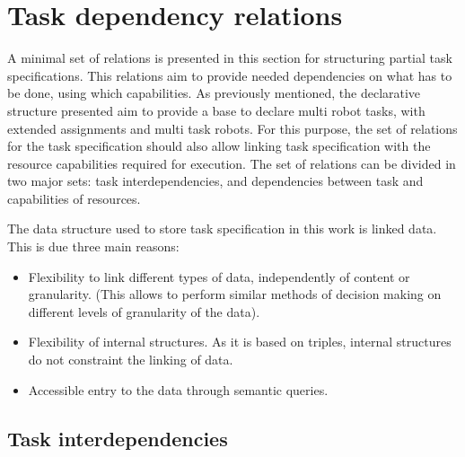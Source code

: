 \documentclass[a4paper,10pt]{article}
\begin{document}
\section{Task dependency relations }


A minimal set of relations is presented in this section for structuring partial task specifications.  This relations aim to provide needed dependencies on what has to be done, using which capabilities.
As previously mentioned, the declarative structure presented aim to provide a base to declare multi robot tasks, with extended assignments and multi task robots. 
For this purpose, the set of relations for the task specification should also allow linking task specification with the resource capabilities required for execution.
The set of relations can be divided in two major sets: task interdependencies, and dependencies between task and capabilities of resources. %

The data structure used to store task specification in this work is linked data. This is due three main reasons:
\begin{itemize}
    \item Flexibility to link different types of data, independently of content or granularity. (This allows to perform similar methods of decision making on different levels of granularity of the data).
    \item Flexibility of internal structures. As it is based on triples, internal structures do not constraint the linking of data.
    \item Accessible entry to the data through semantic queries.
\end{itemize}
\subsection{Task interdependencies}
\end{document}
